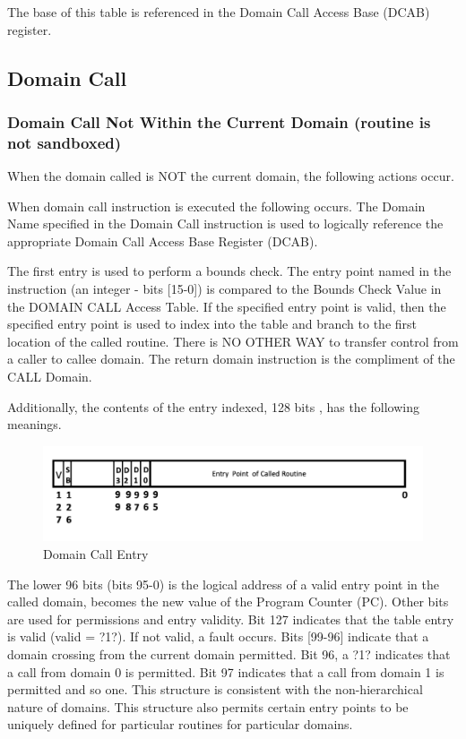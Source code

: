 \documentclass{article}
\begin{document}
\begin{appendices}
The base of this table is referenced in the Domain Call  Access Base (DCAB) register. 

\subsection{Domain Call}
\subsubsection{Domain Call Not Within the Current Domain (routine is not sandboxed)}

When the domain called is NOT the current domain,  the following actions occur.

When domain call instruction is executed the following occurs.  The Domain Name specified in the Domain Call instruction  is used to logically reference the appropriate Domain Call Access Base Register (DCAB).

The first entry is used to perform a bounds check.  The entry point named  in the instruction (an integer - bits [15-0]) is compared to the Bounds Check  Value in  the DOMAIN CALL Access Table.  If  the specified entry point is valid,  then   the specified entry  point is used to index into the table and branch to the first location of the called routine.  There is NO OTHER WAY to transfer control from a caller to callee domain. The return domain instruction is the compliment of the CALL Domain. 

Additionally,  the  contents of the entry indexed,  128 bits , has the following meanings. 

\begin{figure}[h]
\includegraphics[width=\textwidth]{figures/DomainCallEntry.png}
\caption{Domain Call Entry}
\label{fig:DomainCallEntry}
\end{figure}

The lower 96 bits  (bits 95-0) is the logical address of a valid entry point in the called domain,  becomes the new  value of the Program Counter (PC).  Other  bits are used for permissions and entry validity.  Bit 127 indicates that the table entry is valid (valid  =  ?1?).  If not valid, a fault occurs. Bits [99-96]  indicate that a domain crossing from the current domain permitted.  Bit 96,  a ?1? indicates that a call from domain 0 is permitted.  Bit 97 indicates that a call from domain 1 is permitted and so one. This structure is consistent with the non-hierarchical nature of domains.  This structure also permits certain entry points to be uniquely defined for particular routines for particular domains.


\end{appendices}
\end{document}
